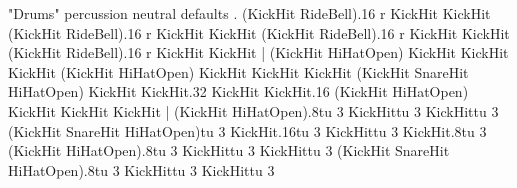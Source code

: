 \track "Drums"
\instrument percussion
\clef neutral
\articulation defaults
.
(KickHit RideBell).16 r KickHit KickHit (KickHit RideBell).16 r KickHit KickHit (KickHit RideBell).16 r KickHit KickHit (KickHit RideBell).16 r KickHit KickHit |
(KickHit HiHatOpen) KickHit KickHit KickHit (KickHit HiHatOpen) KickHit KickHit KickHit (KickHit SnareHit HiHatOpen) KickHit KickHit.32 KickHit KickHit.16 (KickHit HiHatOpen) KickHit KickHit KickHit |
(KickHit HiHatOpen).8{tu 3} KickHit{tu 3} KickHit{tu 3} (KickHit SnareHit HiHatOpen){tu 3} KickHit.16{tu 3} KickHit{tu 3} KickHit.8{tu 3} (KickHit HiHatOpen).8{tu 3} KickHit{tu 3} KickHit{tu 3} (KickHit SnareHit HiHatOpen).8{tu 3} KickHit{tu 3} KickHit{tu 3}
